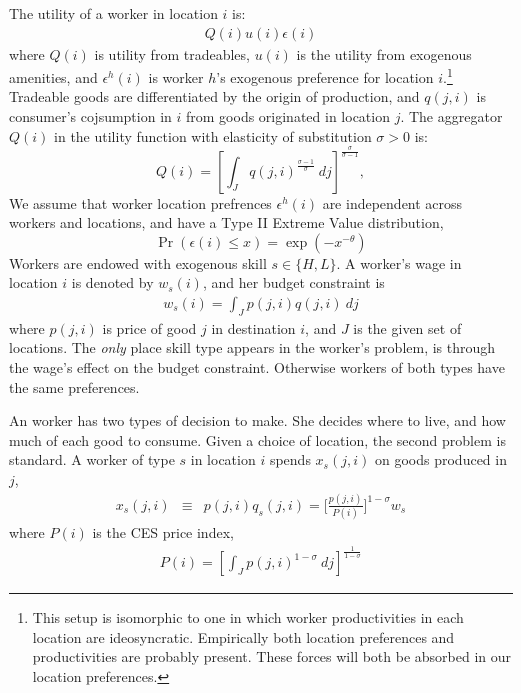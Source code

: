 \documentclass{article}
\begin{document}
The utility of a worker in location $i$ is:
\begin{eqnarray}\label{eq:utility}
	Q(i) u(i) \epsilon(i)
\end{eqnarray} 
where $Q(i)$ is utility from tradeables, $u(i)$ is the utility from exogenous amenities, and $\epsilon^h(i)$ is worker $h$'s exogenous preference for location $i$.\footnote{This setup is isomorphic to one in which worker productivities in each location are ideosyncratic.  Empirically both location preferences and productivities are probably present.  These forces will both be absorbed in our location preferences.}  Tradeable goods are differentiated by the origin of production, and $q(j,i)$ is consumer's cojsumption in $i$ from goods originated in location $j$. The aggregator $Q(i)$ in the utility function with elasticity of substitution $\sigma>0$ is:
\[
	Q(i) = \left[\int_J q(j,i)^{\frac{ \sigma - 1}{\sigma}}~ dj\right]^{\frac{\sigma}{\sigma-1}},
\]
We assume that worker location prefrences $\epsilon^h(i)$ are independent across workers and locations, and have a Type II Extreme Value distribution,
\[
    \Pr(\epsilon(i) \leq x) = \exp(-x^{-\theta})
\]
Workers are endowed with exogenous skill $s \in \{H,L\}$. A worker's wage in location $i$ is denoted by $w_s(i)$, and her budget constraint is 
\begin{eqnarray}\label{eq:budget}
	w_s(i) = \int_J p(j,i)q(j,i)~dj 
\end{eqnarray}
where $p(j,i)$ is price of good $j$ in destination $i$, and $J$ is the given set of locations.  The \emph{only} place skill type appears in the worker's problem, is through the wage's effect on the budget constraint.  Otherwise workers of both types have the same preferences.

An worker has two types of decision to make.  She decides where to live, and how much of each good to consume.  Given a choice of location, the second problem is standard.  A worker of type $s$ in location $i$ spends $x_s(j,i)$ on goods produced in $j$,
\begin{eqnarray}\label{eq:x_s}
	x_s(j,i) & \equiv & p(j,i) q_s(j,i) = \Big[ \frac{p(j,i)}{P(i)} \Big]^{1-\sigma} w_s
\end{eqnarray}
where $P(i)$ is the CES price index,
\begin{eqnarray}\label{eq:price_index}
	P(i) = \left[\int_J p(j,i)^{1-\sigma}~ dj\right]^{\frac{1}{1-\sigma}}
\end{eqnarray}
\end{document}
